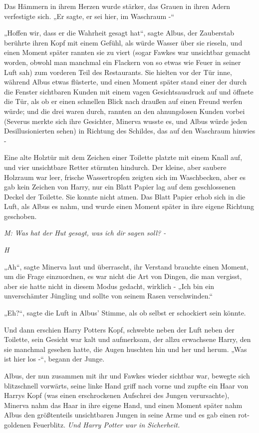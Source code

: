 {Das Hämmern in ihrem Herzen wurde stärker, das Grauen in ihren Adern verfestigte sich. „Er sagte, er sei hier, im Waschraum -“

„Hoffen wir, dass er die Wahrheit gesagt hat“, sagte Albus, der Zauberstab berührte ihren Kopf mit einem Gefühl, als würde Wasser über sie rieseln, und einen Moment später rannten sie zu viert (sogar Fawkes war unsichtbar gemacht worden, obwohl man manchmal ein Flackern von so etwas wie Feuer in seiner Luft sah) zum vorderen Teil des Restaurants. Sie hielten vor der Tür inne, während Albus etwas flüsterte, und einen Moment später stand einer der durch die Fenster sichtbaren Kunden mit einem vagen Gesichtsausdruck auf und öffnete die Tür, als ob er einen schnellen Blick nach draußen auf einen Freund werfen würde; und die drei waren durch, rannten an den ahnungslosen Kunden vorbei (Severus merkte sich ihre Gesichter, Minerva wusste es, und Albus würde jeden Desillusionierten sehen) in Richtung des Schildes, das auf den Waschraum hinwies -

Eine alte Holztür mit dem Zeichen einer Toilette platzte mit einem Knall auf, und vier unsichtbare Retter stürmten hindurch. Der kleine, aber saubere Holzraum war leer, frische Wassertropfen zeigten sich im Waschbecken, aber es gab kein Zeichen von Harry, nur ein Blatt Papier lag auf dem geschlossenen Deckel der Toilette. Sie konnte nicht atmen. Das Blatt Papier erhob sich in die Luft, als Albus es nahm, und wurde einen Moment später in ihre eigene Richtung geschoben.

\emph{M: Was hat der Hut gesagt, was ich dir sagen soll? -}

\hfill\break

\emph{H}

„Ah“, sagte Minerva laut und überrascht, ihr Verstand brauchte einen Moment, um die Frage einzuordnen, es war nicht die Art von Dingen, die man vergisst, aber sie hatte nicht in diesem Modus gedacht, wirklich - „Ich bin ein unverschämter Jüngling und sollte von seinem Rasen verschwinden.“

„Eh?“, sagte die Luft in Albus' Stimme, als ob selbst er schockiert sein könnte.

Und dann erschien Harry Potters Kopf, schwebte neben der Luft neben der Toilette, sein Gesicht war kalt und aufmerksam, der allzu erwachsene Harry, den sie manchmal gesehen hatte, die Augen huschten hin und her und herum. „Was ist hier los -“, begann der Junge.

Albus, der nun zusammen mit ihr und Fawkes wieder sichtbar war, bewegte sich blitzschnell vorwärts, seine linke Hand griff nach vorne und zupfte ein Haar von Harrys Kopf (was einen erschrockenen Aufschrei des Jungen verursachte), Minerva nahm das Haar in ihre eigene Hand, und einen Moment später nahm Albus den größtenteils unsichtbaren Jungen in seine Arme und es gab einen rot-goldenen Feuerblitz. \emph{Und Harry Potter war in Sicherheit.}

}
